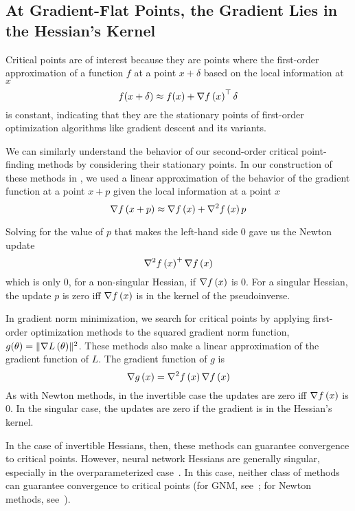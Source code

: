 \documentclass[../../thesis.tex]{subfiles}
\begin{document}
\subsection{At Gradient-Flat Points, the Gradient Lies in the Hessian's Kernel}%

Critical points are of interest because
they are points where the first-order approximation
of a function  $f$ at a point
$x+\delta$ based on the local information at $x$
\begin{equation}
    f(x + \delta) \approx f(x) + \nabla f\left(x\right)^\top \delta
\end{equation}
is constant, indicating that they are the stationary points
of first-order optimization algorithms
like gradient descent and its variants.

We can similarly understand the behavior of our second-order
critical point-finding methods by considering their stationary points.
In our construction of these methods in
,
we used a linear approximation of the behavior
of the gradient function
at a point $x + p$ given the local information at a point $x$
\begin{equation}
    \nabla f\left(x + p\right) \approx \nabla f\left(x\right) + \nabla^2f\left(x\right)p
\end{equation}

Solving for the value of $p$
that makes the left-hand side $0$
gave us the Newton update
\begin{equation}
	\nabla^2f\left(x\right)^{+}\nabla f\left(x\right)
\end{equation}
\noindent which is only $0$,
for a non-singular Hessian,
if $\nabla f\left(x\right)$ is $0$.
For a singular Hessian,
the update $p$ is zero iff $\nabla f\left(x\right)$ is
in the kernel of the pseudoinverse.

In gradient norm minimization,
we search for critical points
by applying first-order optimization methods
to the squared gradient norm function,
$g(\theta) = \lVert\nabla L\left(\theta\right)\rVert^2$.
These methods also make a linear approximation
of the gradient function of $L$.
The gradient function of $g$ is
\begin{equation}
	\nabla g\left(x\right) = \nabla^2f\left(x\right)\nabla f\left(x\right)
\end{equation}
\noindent As with Newton methods, in the invertible case
the updates are zero iff $\nabla f\left(x\right)$ is 0.
In the singular case,
the updates are zero if the gradient is in the Hessian's kernel.

In the case of invertible Hessians, then,
these methods can guarantee convergence to critical points.
However, neural network Hessians are generally singular,
especially in the overparameterized case~\cite{sagun2017,ghorbani2019}.
In this case,
neither class of methods can guarantee
convergence to critical points
(for GNM, see~\cite{doye2002};
for Newton methods, see~\cite{powell1970,griewank1983}).
\end{document}
